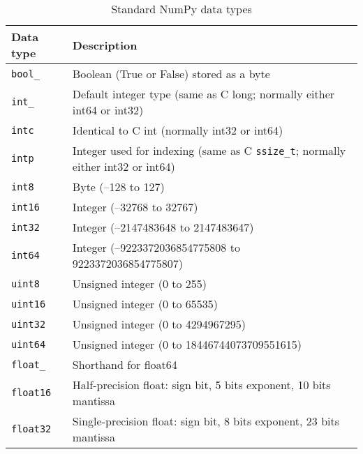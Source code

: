 \begin{table}
    \centering
    \caption{Standard NumPy data types}
    \label{Standard NumPy data types}
    \begin{tabular}{ll}
        \hline
        Data type         & Description                                                                          \\
        \hline
        \verb|bool_|      & Boolean (True or False) stored as a byte                                             \\
        \verb|int_|       & Default integer type (same as C long; normally either int64 or int32)                \\
        \verb|intc|       & Identical to C int (normally int32 or int64)                                         \\
        \verb|intp|       & Integer used for indexing (same as C \verb|ssize_t|; normally either int32 or int64) \\
        \verb|int8|       & Byte (–128 to 127)                                                                   \\
        \verb|int16|      & Integer (–32768 to 32767)                                                            \\
        \verb|int32|      & Integer (–2147483648 to 2147483647)                                                  \\
        \verb|int64|      & Integer (–9223372036854775808 to 9223372036854775807)                                \\
        \verb|uint8|      & Unsigned integer (0 to 255)                                                          \\
        \verb|uint16|     & Unsigned integer (0 to 65535)                                                        \\
        \verb|uint32|     & Unsigned integer (0 to 4294967295)                                                   \\
        \verb|uint64|     & Unsigned integer (0 to 18446744073709551615)                                         \\
        \verb|float_|     & Shorthand for float64                                                                \\
        \verb|float16|    & Half-precision float: sign bit, 5 bits exponent, 10 bits mantissa                    \\
        \verb|float32|    & Single-precision float: sign bit, 8 bits exponent, 23 bits mantissa                  \\

\end{tabular}
\end{table}
